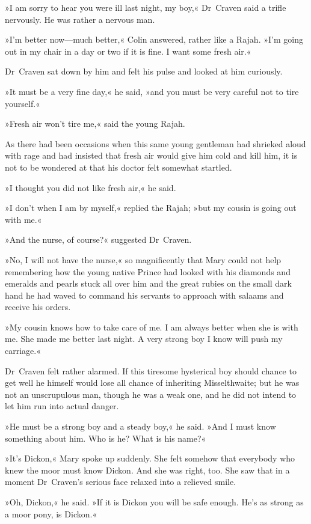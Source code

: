 »I am sorry to hear you were ill last night, my boy,« Dr~Craven said a trifle nervously. He was rather a nervous man.

»I'm better now—much better,« Colin answered, rather like a Rajah. »I'm going out in my chair in a day or two if it is fine. I want some fresh air.«

Dr~Craven sat down by him and felt his pulse and looked at him curiously.

»It must be a very fine day,« he said, »and you must be very careful not to tire yourself.«

»Fresh air won't tire me,« said the young Rajah.

As there had been occasions when this same young gentleman had shrieked aloud with rage and had insisted that fresh air would give him cold and kill him, it is not to be wondered at that his doctor felt somewhat startled.

»I thought you did not like fresh air,« he said.

»I don't when I am by myself,« replied the Rajah; »but my cousin is going out with me.«

»And the nurse, of course?« suggested Dr~Craven.

»No, I will not have the nurse,« so magnificently that Mary could not help remembering how the young native Prince had looked with his diamonds and emeralds and pearls stuck all over him and the great rubies on the small dark hand he had waved to command his servants to approach with salaams and receive his orders.

»My cousin knows how to take care of me. I am always better when she is with me. She made me better last night. A very strong boy I know will push my carriage.«

Dr~Craven felt rather alarmed. If this tiresome hysterical boy should chance to get well he himself would lose all chance of inheriting Misselthwaite; but he was not an unscrupulous man, though he was a weak one, and he did not intend to let him run into actual danger.

»He must be a strong boy and a steady boy,« he said. »And I must know something about him. Who is he? What is his name?«

»It's Dickon,« Mary spoke up suddenly. She felt somehow that everybody who knew the moor must know Dickon. And she was right, too. She saw that in a moment Dr~Craven's serious face relaxed into a relieved smile.

»Oh, Dickon,« he said. »If it is Dickon you will be safe enough. He's as strong as a moor pony, is Dickon.«


